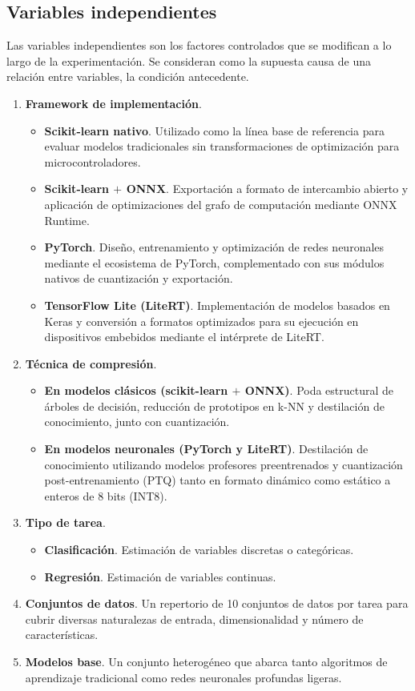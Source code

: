 \documentclass[a4paper,12pt,twoside,final]{book}
\begin{document}
\subsection{Variables independientes}
Las variables independientes son los factores controlados que se modifican a lo largo de la experimentación. Se
consideran como la supuesta causa de una relación entre variables, la condición antecedente.
\begin{enumerate}
  \item \textbf{Framework de implementación}.
  \begin{itemize}
    \item \textbf{Scikit-learn nativo}. Utilizado como la línea base de referencia para evaluar modelos tradicionales
    sin transformaciones de optimización para microcontroladores.
    \item \textbf{Scikit-learn $+$ ONNX}. Exportación a formato de intercambio abierto y aplicación de optimizaciones
    del grafo de computación mediante ONNX Runtime.
    \item \textbf{PyTorch}. Diseño, entrenamiento y optimización de redes neuronales mediante el ecosistema de PyTorch,
    complementado con sus módulos nativos de cuantización y exportación.
    \item \textbf{TensorFlow Lite (LiteRT)}. Implementación de modelos basados en Keras y conversión a formatos
    optimizados para su ejecución en dispositivos embebidos mediante el intérprete de LiteRT.
  \end{itemize}

  \item \textbf{Técnica de compresión}.
  \begin{itemize}
    \item \textbf{En modelos clásicos (scikit-learn $+$ ONNX)}. Poda estructural de árboles de decisión, reducción de
    prototipos en k-NN y destilación de conocimiento, junto con cuantización.
    \item\textbf{En modelos neuronales (PyTorch y LiteRT)}. Destilación de conocimiento utilizando modelos profesores
    preentrenados y cuantización post-entrenamiento (PTQ) tanto en formato dinámico como estático a enteros de 8 bits
    (INT8).
  \end{itemize}

  \item \textbf{Tipo de tarea}.
  \begin{itemize}
    \item \textbf{Clasificación}. Estimación de variables discretas o categóricas.
    \item \textbf{Regresión}. Estimación de variables continuas.
  \end{itemize}

  \item \textbf{Conjuntos de datos}. Un repertorio de 10 conjuntos de datos por tarea para cubrir diversas naturalezas
  de entrada, dimensionalidad y número de características.

  \item \textbf{Modelos base}. Un conjunto heterogéneo que abarca tanto algoritmos de aprendizaje tradicional como redes
  neuronales profundas ligeras.
\end{enumerate}
\end{document}
